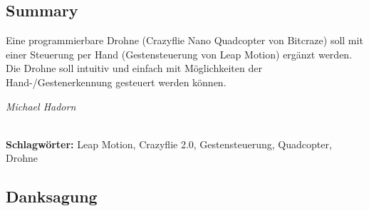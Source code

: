 
\subsection*{Summary}
Eine programmierbare Drohne (Crazyflie Nano Quadcopter von Bitcraze) soll mit einer Steuerung per Hand (Gestensteuerung von Leap Motion) ergänzt werden. Die Drohne soll intuitiv und einfach mit Möglichkeiten der Hand-/Gestenerkennung gesteuert werden können.
\begin{flushright}
	\textit{Michael Hadorn}	
\end{flushright}

%
\mbox{}\\[0.5\baselineskip]\noindent
\textbf{Schlagwörter:} 
Leap Motion, Crazyflie 2.0, Gestensteuerung, Quadcopter, Drohne

\vfill
\subsection*{Danksagung}
